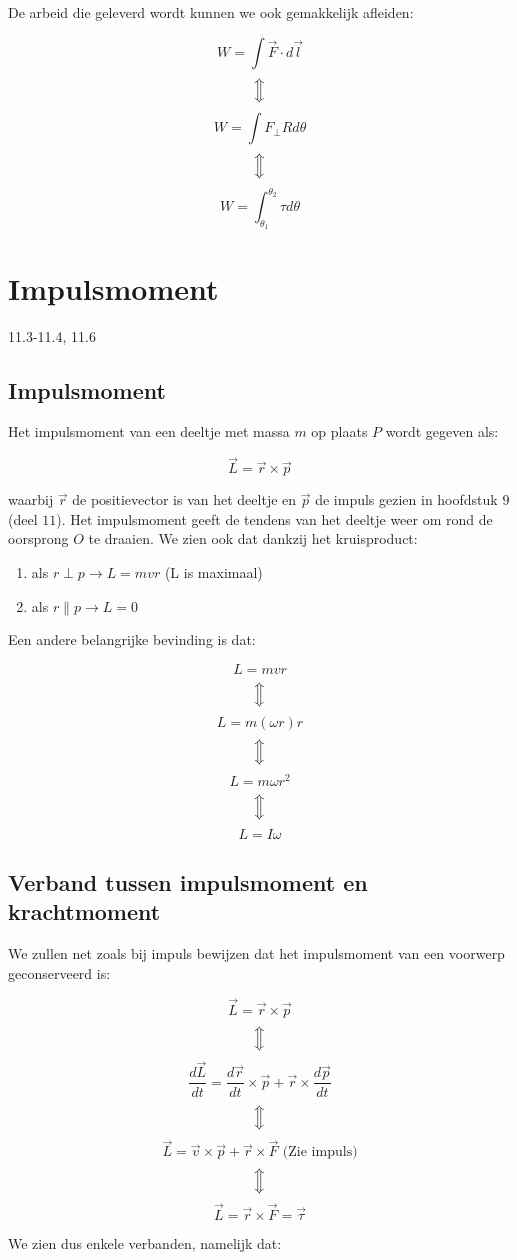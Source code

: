 \documentclass[12pt,a4paper]{article}
\newcommand{\Luda}{\Big\Updownarrow}
\begin{document}
    De arbeid die geleverd wordt kunnen we ook gemakkelijk afleiden:
    
    $$W = \int \vec{F} \cdot d\vec{l}$$
    $$\Luda$$
    $$W = \int F_{\perp}Rd\theta$$
    $$\Luda$$
    $$W = \int_{\theta_{1}}^{\theta_{2}} \tau d\theta$$

    \section{Impulsmoment}
    11.3-11.4, 11.6
    \subsection{Impulsmoment}
    Het impulsmoment van een deeltje met massa $m$ op plaats $P$ wordt gegeven als:
    
    $$\vec{L} = \vec{r} \times \vec{p}$$
    
    waarbij $\vec{r}$ de positievector is van het deeltje en $\vec{p}$ de impuls gezien in hoofdstuk $9$ (deel $11$).
    Het impulsmoment geeft de tendens van het deeltje weer om rond de oorsprong $O$ te draaien. We zien ook dat dankzij
    het kruisproduct:
    
    \begin{enumerate}
    	\item als $r \perp p \to L = mvr$ (L is maximaal)
    	\item als $r \parallel p \to L = 0$
   \end{enumerate}
   
   Een andere belangrijke bevinding is dat:
   
   $$L = mvr$$
   $$\Luda$$
   $$L = m(\omega r)r$$
   $$\Luda$$
   $$L = m\omega r^{2}$$
   $$\Luda$$
   $$L = I\omega$$
   
   \subsection{Verband tussen impulsmoment en krachtmoment}
   We zullen net zoals bij impuls bewijzen dat het impulsmoment van een voorwerp geconserveerd is:
   
   $$\vec{L} = \vec{r} \times \vec{p}$$
   $$\Luda$$
   $$\frac{d\vec{L}}{dt} = \frac{d\vec{r}}{dt} \times \vec{p} + \vec{r} \times \frac{d\vec{p}}{dt}$$
   $$\Luda$$
   $$\vec{L} = \vec{v} \times \vec{p} + \vec{r} \times \vec{F} \textrm{ (Zie impuls)}$$
   $$\Luda$$
   $$\vec{L} = \vec{r} \times \vec{F} = \vec{\tau} $$
   
   We zien dus enkele verbanden, namelijk dat:
   
\end{document}
